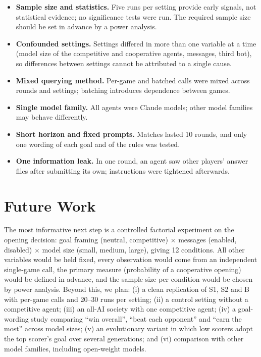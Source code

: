 \documentclass[11pt,a4paper]{article}
\begin{document}
\begin{itemize}
  \item \textbf{Sample size and statistics.} Five runs per setting provide early signals, not statistical evidence; no significance tests were run. The required sample size should be set in advance by a power analysis.
  \item \textbf{Confounded settings.} Settings differed in more than one variable at a time (model size of the competitive and cooperative agents, messages, third bot), so differences between settings cannot be attributed to a single cause.
  \item \textbf{Mixed querying method.} Per-game and batched calls were mixed across rounds and settings; batching introduces dependence between games.
  \item \textbf{Single model family.} All agents were Claude models; other model families may behave differently.
  \item \textbf{Short horizon and fixed prompts.} Matches lasted 10 rounds, and only one wording of each goal and of the rules was tested.
  \item \textbf{One information leak.} In one round, an agent saw other players' answer files after submitting its own; instructions were tightened afterwards.
\end{itemize}

\section{Future Work}

The most informative next step is a controlled factorial experiment on the opening decision: goal framing (neutral, competitive) $\times$ messages (enabled, disabled) $\times$ model size (small, medium, large), giving 12 conditions. All other variables would be held fixed, every observation would come from an independent single-game call, the primary measure (probability of a cooperative opening) would be defined in advance, and the sample size per condition would be chosen by power analysis. Beyond this, we plan: (i) a clean replication of S1, S2 and B with per-game calls and 20--30 runs per setting; (ii) a control setting without a competitive agent; (iii) an all-AI society with one competitive agent; (iv) a goal-wording study comparing ``win overall'', ``beat each opponent'' and ``earn the most'' across model sizes; (v) an evolutionary variant in which low scorers adopt the top scorer's goal over several generations; and (vi) comparison with other model families, including open-weight models.
\end{document}
